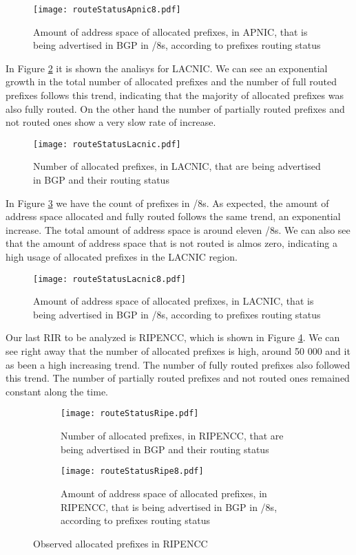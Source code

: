 \documentclass[11pt,a4paper]{scrreprt}
\begin{document}
\begin{figure}[!h]
\centering
\texttt{[image: routeStatusApnic8.pdf]}
\caption{Amount of address space of allocated prefixes, in APNIC, that is being advertised in BGP in /8s, according to prefixes routing status}
\label{fig:routingStatusApnic8}
\end{figure}

In Figure \ref{fig:routingStatusLacnic} it is shown the analisys for LACNIC. We can see an exponential growth in the total number of allocated prefixes and the number of full routed prefixes follows this trend, indicating that the majority of allocated prefixes was also fully routed. On the other hand the number of partially routed prefixes and not routed ones show a very slow rate of increase.

\begin{figure}[!h]
\centering
\texttt{[image: routeStatusLacnic.pdf]}
\caption{Number of allocated prefixes, in LACNIC, that are being advertised in BGP and their routing status}
\label{fig:routingStatusLacnic}
\end{figure}

In Figure \ref{fig:routingStatusLacnic8} we have the count of prefixes in /8s. As expected, the amount of address space allocated and fully routed follows the same trend, an exponential increase. The total amount of address space is around eleven /8s. We can also see that the amount of address space that is not routed is almos zero, indicating a high usage of allocated prefixes in the LACNIC region.

\begin{figure}[!h]
\centering
\texttt{[image: routeStatusLacnic8.pdf]}
\caption{Amount of address space of allocated prefixes, in LACNIC, that is being advertised in BGP in /8s, according to prefixes routing status}
\label{fig:routingStatusLacnic8}
\end{figure}

Our last RIR to be analyzed is RIPENCC, which is shown in Figure \ref{fig:routingStatusRipe}. We can see right away that the number of allocated prefixes is high, around 50 000 and it as been a high increasing trend. The number of fully routed prefixes also followed this trend. The number of partially routed prefixes and not routed ones remained constant along the time.

\begin{figure}[!h]
\centering
\begin{subfigure}{.5\textwidth}
  \centering
  \texttt{[image: routeStatusRipe.pdf]}
  \caption{Number of allocated prefixes, in RIPENCC, that are being advertised in BGP and their routing status}
  \label{fig:routingStatusRipe}
\end{subfigure}%
\begin{subfigure}{.5\textwidth}
  \centering
  \texttt{[image: routeStatusRipe8.pdf]}
  \caption{Amount of address space of allocated prefixes, in RIPENCC, that is being advertised in BGP in /8s, according to prefixes routing status}
  \label{fig:routingStatusRipe8}
\end{subfigure}
\caption{Observed allocated prefixes in RIPENCC}
\label{fig:test}
\end{figure}
\end{document}
